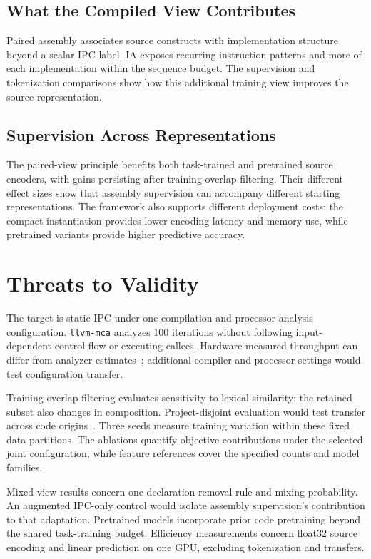 \documentclass[conference]{IEEEtran}
\newcommand{\llvmmca}{\texttt{llvm-mca}}
\begin{document}
\subsection{What the Compiled View Contributes}
Paired assembly associates source constructs with implementation structure beyond a scalar IPC label. IA exposes recurring instruction patterns and more of each implementation within the sequence budget. The supervision and tokenization comparisons show how this additional training view improves the source representation.

\subsection{Supervision Across Representations}
The paired-view principle benefits both task-trained and pretrained source encoders, with gains persisting after training-overlap filtering. Their different effect sizes show that assembly supervision can accompany different starting representations. The framework also supports different deployment costs: the compact instantiation provides lower encoding latency and memory use, while pretrained variants provide higher predictive accuracy.

\section{Threats to Validity}
\label{sec:threats}
The target is static IPC under one compilation and processor-analysis configuration. \llvmmca{} analyzes 100 iterations without following input-dependent control flow or executing callees. Hardware-measured throughput can differ from analyzer estimates~\cite{chen2019bhive,renda2020difftune}; additional compiler and processor settings would test configuration transfer.

Training-overlap filtering evaluates sensitivity to lexical similarity; the retained subset also changes in composition. Project-disjoint evaluation would test transfer across code origins~\cite{bock2023domain}. Three seeds measure training variation within these fixed data partitions. The ablations quantify objective contributions under the selected joint configuration, while feature references cover the specified counts and model families.

Mixed-view results concern one declaration-removal rule and mixing probability. An augmented IPC-only control would isolate assembly supervision's contribution to that adaptation. Pretrained models incorporate prior code pretraining beyond the shared task-training budget. Efficiency measurements concern float32 source encoding and linear prediction on one GPU, excluding tokenization and transfers.
\end{document}
